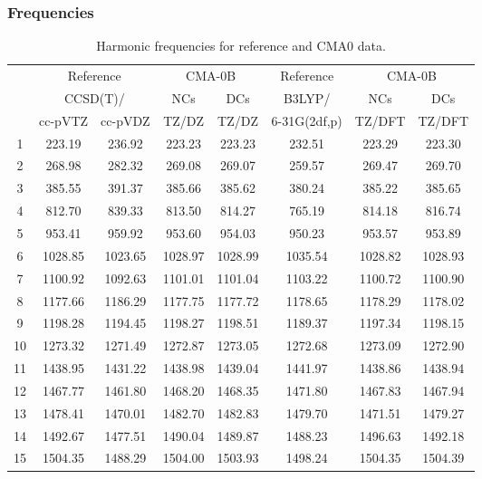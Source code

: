 \documentclass[10pt,oneside]{article}
\begin{document}
\subsubsection*{Frequencies}
\begin{table}[h!]
\centering
\caption{Harmonic frequencies for reference and CMA0 data.}
\begin{tabular}{cccccccc}
\toprule
{} & \multicolumn{2}{c}{Reference} & \multicolumn{2}{c}{CMA-0B} &    Reference & \multicolumn{2}{c}{CMA-0B} \\
{} & \multicolumn{2}{c}{CCSD(T)/} &     NCs &     DCs &       B3LYP/ &     NCs &     DCs \\
{} &   cc-pVTZ & cc-pVDZ &   TZ/DZ &   TZ/DZ & 6-31G(2df,p) &  TZ/DFT &  TZ/DFT \\
\midrule
1  &    223.19 &  236.92 &  223.23 &  223.23 &       232.51 &  223.29 &  223.30 \\
2  &    268.98 &  282.32 &  269.08 &  269.07 &       259.57 &  269.47 &  269.70 \\
3  &    385.55 &  391.37 &  385.66 &  385.62 &       380.24 &  385.22 &  385.65 \\
4  &    812.70 &  839.33 &  813.50 &  814.27 &       765.19 &  814.18 &  816.74 \\
5  &    953.41 &  959.92 &  953.60 &  954.03 &       950.23 &  953.57 &  953.89 \\
6  &   1028.85 & 1023.65 & 1028.97 & 1028.99 &      1035.54 & 1028.82 & 1028.93 \\
7  &   1100.92 & 1092.63 & 1101.01 & 1101.04 &      1103.22 & 1100.72 & 1100.90 \\
8  &   1177.66 & 1186.29 & 1177.75 & 1177.72 &      1178.65 & 1178.29 & 1178.02 \\
9  &   1198.28 & 1194.45 & 1198.27 & 1198.51 &      1189.37 & 1197.34 & 1198.15 \\
10 &   1273.32 & 1271.49 & 1272.87 & 1273.05 &      1272.68 & 1273.09 & 1272.90 \\
11 &   1438.95 & 1431.22 & 1438.98 & 1439.04 &      1441.97 & 1438.86 & 1438.94 \\
12 &   1467.77 & 1461.80 & 1468.20 & 1468.35 &      1471.80 & 1467.83 & 1467.94 \\
13 &   1478.41 & 1470.01 & 1482.70 & 1482.83 &      1479.70 & 1471.51 & 1479.27 \\
14 &   1492.67 & 1477.51 & 1490.04 & 1489.87 &      1488.23 & 1496.63 & 1492.18 \\
15 &   1504.35 & 1488.29 & 1504.00 & 1503.93 &      1498.24 & 1504.35 & 1504.39 \\

\end{tabular}
\end{table}
\end{document}
